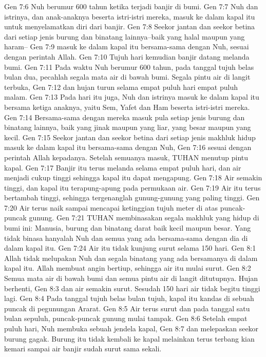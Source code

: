 Gen 7:6  Nuh berumur 600 tahun ketika terjadi banjir di bumi.
Gen 7:7  Nuh dan istrinya, dan anak-anaknya beserta istri-istri mereka, masuk ke dalam kapal itu untuk menyelamatkan diri dari banjir.
Gen 7:8  Seekor jantan dan seekor betina dari setiap jenis burung dan binatang lainnya--baik yang halal maupun yang haram--
Gen 7:9  masuk ke dalam kapal itu bersama-sama dengan Nuh, sesuai dengan perintah Allah.
Gen 7:10  Tujuh hari kemudian banjir datang melanda bumi.
Gen 7:11  Pada waktu Nuh berumur 600 tahun, pada tanggal tujuh belas bulan dua, pecahlah segala mata air di bawah bumi. Segala pintu air di langit terbuka,
Gen 7:12  dan hujan turun selama empat puluh hari empat puluh malam.
Gen 7:13  Pada hari itu juga, Nuh dan istrinya masuk ke dalam kapal itu bersama ketiga anaknya, yaitu Sem, Yafet dan Ham beserta istri-istri mereka.
Gen 7:14  Bersama-sama dengan mereka masuk pula setiap jenis burung dan binatang lainnya, baik yang jinak maupun yang liar, yang besar maupun yang kecil.
Gen 7:15  Seekor jantan dan seekor betina dari setiap jenis makhluk hidup masuk ke dalam kapal itu bersama-sama dengan Nuh,
Gen 7:16  sesuai dengan perintah Allah kepadanya. Setelah semuanya masuk, TUHAN menutup pintu kapal.
Gen 7:17  Banjir itu terus melanda selama empat puluh hari, dan air menjadi cukup tinggi sehingga kapal itu dapat mengapung.
Gen 7:18  Air semakin tinggi, dan kapal itu terapung-apung pada permukaan air.
Gen 7:19  Air itu terus bertambah tinggi, sehingga tergenanglah gunung-gunung yang paling tinggi.
Gen 7:20  Air terus naik sampai mencapai ketinggian tujuh meter di atas puncak-puncak gunung.
Gen 7:21  TUHAN membinasakan segala makhluk yang hidup di bumi ini: Manusia, burung dan binatang darat baik kecil maupun besar. Yang tidak binasa hanyalah Nuh dan semua yang ada bersama-sama dengan dia di dalam kapal itu.
Gen 7:24  Air itu tidak kunjung surut selama 150 hari.
Gen 8:1  Allah tidak melupakan Nuh dan segala binatang yang ada bersamanya di dalam kapal itu. Allah membuat angin bertiup, sehingga air itu mulai surut.
Gen 8:2  Semua mata air di bawah bumi dan semua pintu air di langit ditutupnya. Hujan berhenti,
Gen 8:3  dan air semakin surut. Sesudah 150 hari air tidak begitu tinggi lagi.
Gen 8:4  Pada tanggal tujuh belas bulan tujuh, kapal itu kandas di sebuah puncak di pegunungan Ararat.
Gen 8:5  Air terus surut dan pada tanggal satu bulan sepuluh, puncak-puncak gunung mulai tampak.
Gen 8:6  Setelah empat puluh hari, Nuh membuka sebuah jendela kapal,
Gen 8:7  dan melepaskan seekor burung gagak. Burung itu tidak kembali ke kapal melainkan terus terbang kian kemari sampai air banjir sudah surut sama sekali.
